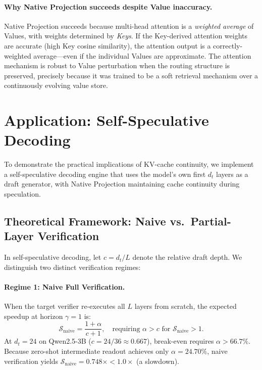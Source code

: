 \documentclass{article}
\newcommand{\dt}{d_t}
\begin{document}
\paragraph{Why Native Projection succeeds despite Value inaccuracy.}
Native Projection succeeds because multi-head attention is a \emph{weighted average} of Values, with weights determined by \emph{Keys}. If the Key-derived attention weights are accurate (high Key cosine similarity), the attention output is a correctly-weighted average---even if the individual Values are approximate. The attention mechanism is robust to Value perturbation when the routing structure is preserved, precisely because it was trained to be a soft retrieval mechanism over a continuously evolving value store.

\section{Application: Self-Speculative Decoding}
\label{sec:speculative}

To demonstrate the practical implications of KV-cache continuity, we implement a self-speculative decoding engine that uses the model's own first $\dt$ layers as a draft generator, with Native Projection maintaining cache continuity during speculation.

\subsection{Theoretical Framework: Naive vs.\ Partial-Layer Verification}

In self-speculative decoding, let $c = \dt / L$ denote the relative draft depth. We distinguish two distinct verification regimes:

\paragraph{Regime 1: Naive Full Verification.}
When the target verifier re-executes all $L$ layers from scratch, the expected speedup at horizon $\gamma{=}1$ is:
\begin{equation}
    \mathcal{S}_{\text{naive}} = \frac{1 + \alpha}{c + 1}, \quad \text{requiring } \alpha > c \text{ for } \mathcal{S}_{\text{naive}} > 1.
    \label{eq:speedup_naive}
\end{equation}
At $d_t = 24$ on Qwen2.5-3B ($c = 24/36 \approx 0.667$), break-even requires $\alpha > 66.7\%$. Because zero-shot intermediate readout achieves only $\alpha = 24.70\%$, naive verification yields $\mathcal{S}_{\text{naive}} = 0.748\times < 1.0\times$ (a slowdown).
\end{document}
